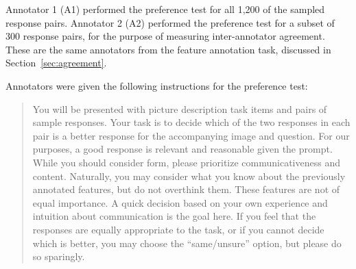 Annotator 1 (A1) performed the preference test for all 1,200 of the sampled response pairs. Annotator 2 (A2) performed the preference test for a subset of 300 response pairs, for the purpose of measuring inter-annotator agreement. These are the same annotators from the feature annotation task, discussed in Section~\ref{sec:agreement}. 

Annotators were given the following instructions for the preference test:

\begin{quote}
You will be presented with picture description task items and pairs of sample responses. Your task is to decide which of the two responses in each pair is a better response for the accompanying image and question. For our purposes, a good response is relevant and reasonable given the prompt. While you should consider form, please prioritize communicativeness and content. Naturally, you may consider what you know about the previously annotated features, but do not overthink them. These features are not of equal importance. A quick decision based on your own experience and intuition about communication is the goal here. If you feel that the responses are equally appropriate to the task, or if you cannot decide which is better, you may choose the ``same/unsure'' option, but please do so sparingly.
\end{quote}

